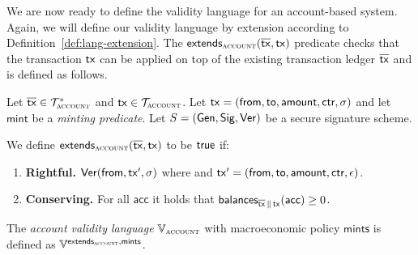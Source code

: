 We are now ready to define the validity language for an account-based system.
Again, we will
define our validity language by extension according to
Definition~\ref{def:lang-extension}.
The $\textsf{extends}_{\textsc{account}}(\overline{\mathsf{tx}}, \mathsf{tx})$ predicate checks that
the transaction $\mathsf{tx}$ can be applied on top of the existing transaction ledger
$\overline{\mathsf{tx}}$ and is defined as follows.

\begin{definition}
  Let $\overline{\mathsf{tx}} \in \mathcal{T}_\textsc{account}^*$ and $\mathsf{tx} \in \mathcal{T}_{\textsc{account}}$.
  Let $\mathsf{tx} = (\textsf{from}, \textsf{to}, \textsf{amount}, \textsf{ctr}, \sigma)$
  and let $\textsf{mint}$ be a \emph{minting predicate}.
  Let $S = (\mathsf{Gen}, \mathsf{Sig}, \mathsf{Ver})$ be a secure signature scheme.

  We define $\textsf{extends}_{\textsc{account}}(\overline{\mathsf{tx}}, \mathsf{tx})$ to be $\textsf{true}$
  if:

  \begin{enumerate}
    \item \textbf{Rightful.}
          $\mathsf{Ver}(\textsf{from}, \mathsf{tx}', \sigma)$ where
          and $\mathsf{tx}' = (\textsf{from}, \textsf{to}, \textsf{amount}, \textsf{ctr}, \epsilon)$.
    \item \textbf{Conserving.}
          For all $\textsf{acc}$ it holds that
          $\textsf{balances}_{\overline{\mathsf{tx}} \,\|\, \mathsf{tx}}(\textsf{acc}) \geq 0$.
  \end{enumerate}

  The \emph{account validity language} $\mathbb{V}_{\textsc{account}}$ with macroeconomic
  policy $\textsf{mints}$ is defined as
  $\mathbb{V}^{\textsf{extends}_{\textsc{account}},\textsf{mints}}$.
\end{definition}
